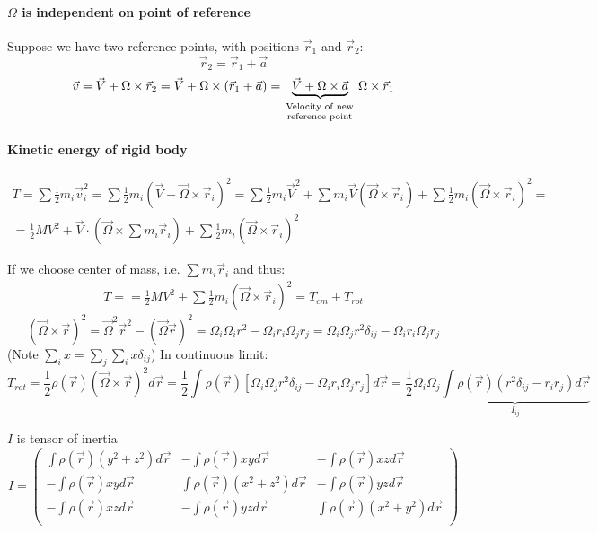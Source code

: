 

\paragraph{$\Omega$ is independent on point of reference}
Suppose we have two reference points, with positions $\vec{r}_1$ and $\vec{r}_2$:
$$\vec{r}_2 = \vec{r}_1 + \vec{a}$$
$$\vec{v} = \vec{V}+ \Omega \times \vec{r}_2 = \vec{V}+ \Omega \times (\vec{r}_1+\vec{a}) = \underbrace{\vec{V}+\Omega \times \vec{a}}_{_{\parbox{2cm}{\scriptsize \centering Velocity of new reference point}}} \Omega \times \vec{r}_1$$

\paragraph{Kinetic energy of rigid body}
\begin{align*}
T = \sum \frac{1}{2}m_i\vec{v}_i^2 = \sum \frac{1}{2}m_i\left(\vec{V} + \vec{\Omega} \times \vec{r}_i\right)^2 = \sum \frac{1}{2}m_i\vec{V}^2 + \sum m_i\vec{V} \left(\vec{\Omega} \times \vec{r}_i\right)+ \sum \frac{1}{2}m_i \left(\vec{\Omega} \times \vec{r}_i\right)^2 =\\= \frac{1}{2}MV^2 + \vec{V} \cdot \left(\vec{\Omega} \times \sum m_i \vec{r}_i\right) + \sum \frac{1}{2}m_i \left(\vec{\Omega} \times \vec{r}_i\right)^2
\end{align*}

If we choose center of mass, i.e. $\sum m_i \vec{r}_i$ and thus:
\begin{align*}
T = = \frac{1}{2}MV^2 + \sum \frac{1}{2}m_i \left(\vec{\Omega} \times \vec{r}_i\right)^2 = T_{cm} + T_{rot}
\end{align*}
$$ \left(\vec{\Omega} \times \vec{r}\right)^2 = \vec{\Omega}^2 \vec{r}^2 - \left(\vec{\Omega} \vec{r}\right)^2 = \Omega_i\Omega_i r^2 - \Omega_i r_i \Omega_j r_j = \Omega_i\Omega_j r^2 \delta_{ij} - \Omega_i r_i \Omega_j r_j $$
(Note $\sum_i x = \sum_j \sum_i x \delta_{ij}$)
In continuous limit:
$$T_{rot} = \frac{1}{2} \rho(\vec{r}) \left(\vec{\Omega} \times \vec{r}\right)^2  d\vec{r} = \frac{1}{2} \int \rho(\vec{r})  \left[\Omega_i\Omega_j r^2 \delta_{ij} - \Omega_i r_i \Omega_j r_j\right] d\vec{r} = \frac{1}{2}\Omega_i \Omega_j \underbrace{\int \rho(\vec{r})( r^2 \delta_{ij} -  r_i r_j )d\vec{r}}_{I_{ij}} $$

$I$ is tensor of inertia
$$I = \begin{pmatrix}
\int \rho(\vec{r}) (y^2+z^2) d\vec{r} & -\int \rho(\vec{r}) xy d\vec{r} & -\int \rho(\vec{r}) xz d\vec{r}\\ 
-\int \rho(\vec{r}) xy d\vec{r} & \int \rho(\vec{r}) (x^2+z^2) d\vec{r} & -\int \rho(\vec{r}) yz d\vec{r}\\
-\int \rho(\vec{r}) xz d\vec{r} & -\int \rho(\vec{r}) yz d\vec{r} & \int \rho(\vec{r}) (x^2+y^2) d\vec{r}  \\
\end{pmatrix}$$
